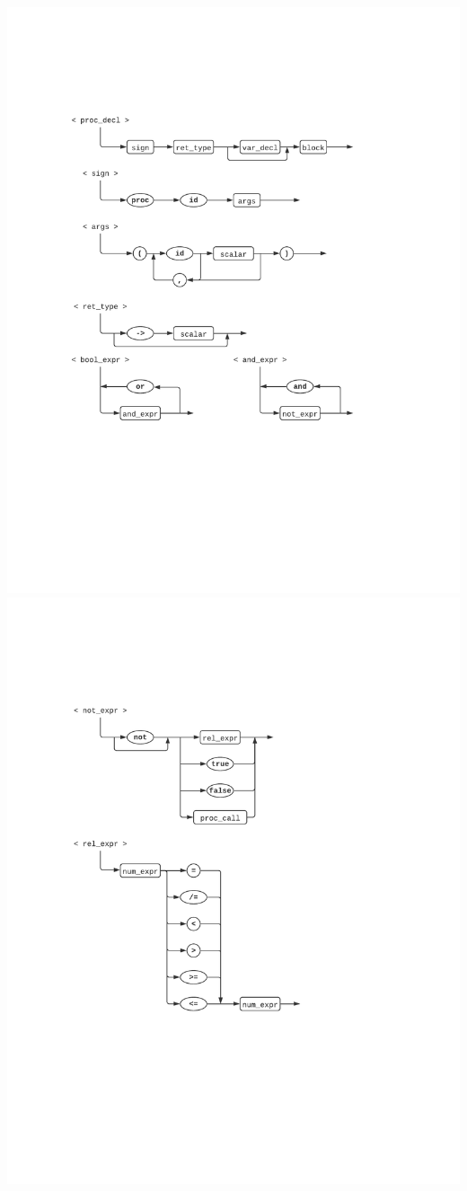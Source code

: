 \documentclass[12pt, titlepage]{article}
\begin{document}
\includegraphics[trim={1in, 1in, 1in, 1in}, clip, scale=0.95]{d2}
\newpage
\includegraphics[trim={1in, 1in, 1in, 1in}, clip, scale=0.95]{d3}
\end{document}
